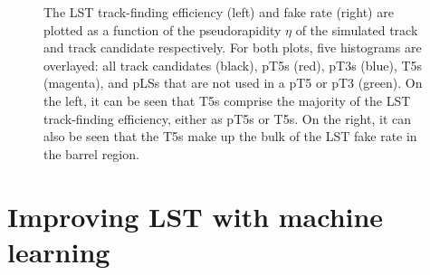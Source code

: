 \begin{figure}[!htb]
    \centering
    \qquad
    \caption{
        The LST track-finding efficiency (left) and fake rate (right) are plotted as a function of the pseudorapidity $\eta$ of the simulated track and track candidate respectively.
        For both plots, five histograms are overlayed: all track candidates (black), pT5s (red), pT3s (blue), T5s (magenta), and pLSs that are not used in a pT5 or pT3 (green).
        On the left, it can be seen that T5s comprise the majority of the LST track-finding efficiency, either as pT5s or T5s.
        On the right, it can also be seen that the T5s make up the bulk of the LST fake rate in the barrel region.
    }
    \label{fig:lst_performance}
\end{figure}

\section{Improving LST with machine learning}

